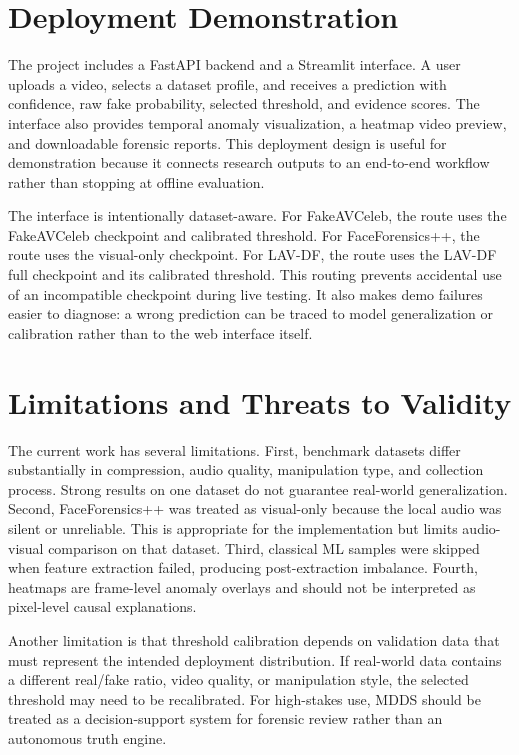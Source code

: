 \documentclass[conference]{IEEEtran}
\begin{document}
\section{Deployment Demonstration}
The project includes a FastAPI backend and a Streamlit interface. A user uploads a video, selects a dataset profile, and receives a prediction with confidence, raw fake probability, selected threshold, and evidence scores. The interface also provides temporal anomaly visualization, a heatmap video preview, and downloadable forensic reports. This deployment design is useful for demonstration because it connects research outputs to an end-to-end workflow rather than stopping at offline evaluation.

The interface is intentionally dataset-aware. For FakeAVCeleb, the route uses the FakeAVCeleb checkpoint and calibrated threshold. For FaceForensics++, the route uses the visual-only checkpoint. For LAV-DF, the route uses the LAV-DF full checkpoint and its calibrated threshold. This routing prevents accidental use of an incompatible checkpoint during live testing. It also makes demo failures easier to diagnose: a wrong prediction can be traced to model generalization or calibration rather than to the web interface itself.

\section{Limitations and Threats to Validity}
The current work has several limitations. First, benchmark datasets differ substantially in compression, audio quality, manipulation type, and collection process. Strong results on one dataset do not guarantee real-world generalization. Second, FaceForensics++ was treated as visual-only because the local audio was silent or unreliable. This is appropriate for the implementation but limits audio-visual comparison on that dataset. Third, classical ML samples were skipped when feature extraction failed, producing post-extraction imbalance. Fourth, heatmaps are frame-level anomaly overlays and should not be interpreted as pixel-level causal explanations.

Another limitation is that threshold calibration depends on validation data that must represent the intended deployment distribution. If real-world data contains a different real/fake ratio, video quality, or manipulation style, the selected threshold may need to be recalibrated. For high-stakes use, MDDS should be treated as a decision-support system for forensic review rather than an autonomous truth engine.
\end{document}
